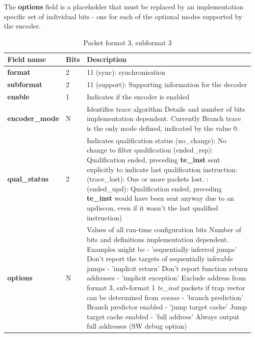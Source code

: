 The \textbf{options} field is a placeholder that must be replaced by an implementation specific set of individual bits - one for each of the
optional modes supported by the encoder.

\begin{table}[htp]
  \centering
  \caption{Packet format 3, subformat 3}
  \label{tab:te_inst3}
  \begin{tabulary}{\textwidth}{|l|p{35mm}|p{90mm}|}
    \hline
     {\bf Field name} & {\bf Bits} & {\bf Description} \\
     \hline
     \textbf{format} & 2 & 11 (sync): synchronisation\\
     \hline
     \textbf{subformat}  & 2 & 11 (support): Supporting information for the decoder \\
     \hline
     \textbf{enable} & 1 & Indicates if the encoder is enabled\\
     \hline
     \textbf{encoder\_mode} & N & Identifies trace algorithm\newline
       Details and number of bits implementation dependent.  Currently Branch trace is the only mode defined, indicated by the value 0.\\
     \hline
     \textbf{qual\_status} & 2 & Indicates qualification status (no\_change): No change to filter qualification  (ended\_rep): Qualification ended, preceding \textbf{te\_inst} sent explicitly to indicate last qualification instruction: (trace\_lost): One or more packets lost. : (ended\_upd): Qualification ended, preceding \textbf{te\_inst} would have been sent anyway due to an updiscon, even if it wasn't the last qualified instruction)\\
     \hline
     \textbf{options} & N & Values of all run-time configuration bits\newline
       Number of bits and definitions implementation dependent.  Examples might be\newline
       - 'sequentially inferred jumps' Don't report the targets of sequentially inferable jumps\newline
       - 'implicit return' Don't report function return addresses \newline
       - 'implicit exception' Exclude address from format 3, sub-format 1 \textit{te\_inst} packets if trap vector can be determined from \textit{ecause}\newline
       - 'branch prediction' Branch predictor enabled\newline
       - 'jump target cache' Jump target cache enabled\newline
       - 'full address' Always output full addresses (SW debug option)\\
       \hline
  \end{tabulary}
\end{table}

